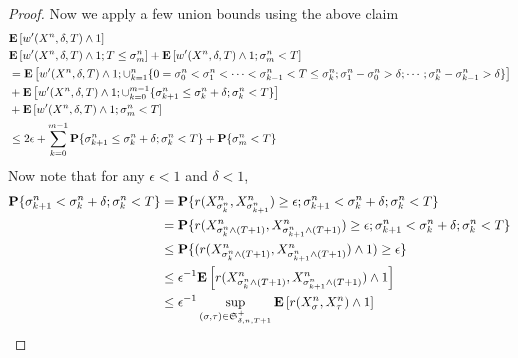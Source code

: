 \begin{proof}
Now we apply a few union bounds using the above claim
\begin{align*}
&\textbf{E}\left[w^\prime(X^n, \delta, T) \wedge 1\right] \\
&\textbf{E}\left[w^\prime(X^n, \delta, T) \wedge 1; T \leq \sigma^n_m\right] + \textbf{E}\left[w^\prime(X^n, \delta, T) \wedge 1; \sigma^n_m < T\right] \\
&= \textbf{E}\left[w^\prime(X^n, \delta, T) \wedge 1; \cup_{k=1}^n \lbrace 0=\sigma^n_0 < \sigma^n_1 < \dotsb < \sigma^n_{k-1} < T \leq \sigma^n_k; \sigma^n_1 - \sigma^n_0 > \delta; \dotsb;\sigma^n_k - \sigma^n_{k-1} > \delta \rbrace\right] \\
&+\textbf{E}\left[w^\prime(X^n, \delta, T) \wedge 1; \cup_{k=0}^{m-1} \lbrace\sigma^n_{k+1} \leq \sigma^n_k+\delta; \sigma^n_k <T \rbrace\right] \\
&+ \textbf{E}\left[w^\prime(X^n, \delta, T) \wedge 1; \sigma^n_m < T\right] \\
&\leq 2 \epsilon + \sum_{k=0}^{m-1} \textbf{P}\{\sigma^n_{k+1} \leq \sigma^n_k+\delta; \sigma^n_k <T\} + \textbf{P}\{\sigma^n_m < T\} \\
\end{align*}
Now note that for any $\epsilon < 1$ and $\delta < 1$,
\begin{align*}
\textbf{P}\{\sigma^n_{k+1} < \sigma^n_k + \delta ; \sigma^n_k < T\} 
&=\textbf{P}\{r(X^n_{\sigma^n_k}, X^n_{\sigma^n_{k+1}})  \geq \epsilon ; \sigma^n_{k+1} < \sigma^n_k + \delta ; \sigma^n_k < T\} \\
&=\textbf{P}\{r(X^n_{\sigma^n_k \wedge (T+1)}, X^n_{\sigma^n_{k+1} \wedge (T+1)})  \geq \epsilon ; \sigma^n_{k+1} < \sigma^n_k + \delta ; \sigma^n_k < T\} \\
&\leq \textbf{P}\{(r(X^n_{\sigma^n_k \wedge (T+1)}, X^n_{\sigma^n_{k+1} \wedge (T+1)})  \wedge 1) \geq \epsilon\} \\
&\leq \epsilon^{-1} \textbf{E}\left[r(X^n_{\sigma^n_k \wedge (T+1)}, X^n_{\sigma^n_{k+1} \wedge (T+1)}) \wedge 1\right] \\
&\leq \epsilon^{-1} \sup_{(\sigma, \tau) \in \mathfrak{S}^+_{\delta,n,T+1}} \textbf{E}\left[r(X^n_\sigma, X^n_\tau) \wedge 1\right] 
\end{align*}


\end{proof}
